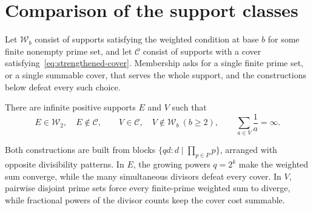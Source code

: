 \documentclass[11pt]{article}
\begin{document}
\section{Comparison of the support classes}\label{sec:comparison}
Let $\mathcal W_b$ consist of supports satisfying the weighted condition
at base $b$ for some finite nonempty prime set, and let $\mathcal C$
consist of supports with a cover satisfying~\eqref{eq:strengthened-cover}.
Membership asks for a single finite prime set, or a single summable
cover, that serves the whole support, and the constructions below defeat
every such choice.

\begin{proposition}
\label{res:weighted-cover-incomparability}
There are infinite positive supports $E$ and $V$ such that
\[
 E\in\mathcal W_2,\quad E\notin\mathcal C,\qquad
 V\in\mathcal C,\quad V\notin\mathcal W_b\ (b\ge2),\qquad
 \sum_{a\in V}\frac1a=\infty.
\]
\end{proposition}

Both constructions are built from blocks $\{qd:d\mid\prod_{p\in P}p\}$,
arranged with opposite divisibility patterns. In $E$, the growing
powers $q=2^k$ make the weighted sum converge, while the many
simultaneous divisors defeat every cover. In $V$, pairwise disjoint
prime sets force every finite-prime weighted sum to diverge, while
fractional powers of the divisor counts keep the cover cost summable.
\end{document}
